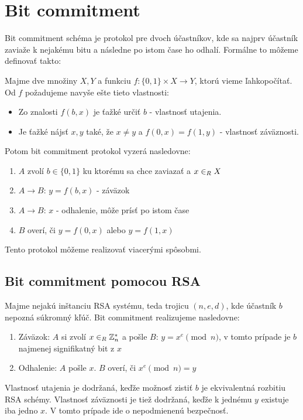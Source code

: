 \section{Bit commitment}

Bit commitment schéma je protokol pre dvoch účastníkov, kde sa najprv účastník
zaviaže k nejakému bitu a následne po istom čase ho odhalí.
Formálne to môžeme definovať takto:

\begin{definicia}
Majme dve množiny $X,Y$ a funkciu $f\colon \{0,1\} \times X \to Y$, ktorú vieme
\clqq ľahko\crqq počítať. Od $f$ požadujeme navyše ešte tieto vlastnosti:
\begin{itemize}
\item Zo znalosti $f(b,x)$ je ťažké určiť $b$ - vlastnosť utajenia.
\item Je ťažké nájsť $x, y$ také, že $x \neq y$ a $f(0,x) = f(1,y)$ - vlastnosť záväznosti.
\end{itemize}
Potom bit commitment protokol vyzerá nasledovne:
\begin{enumerate}
\item $A$ zvolí $b \in \{0,1\}$ ku ktorému sa chce zaviazať a $x \in_{R} X$
\item $A \to B$: $y = f(b,x)$ - záväzok
\item $A \to B$: $x$ - odhalenie, môže prísť po istom čase
\item $B$ overí, či $y = f(0,x)$ alebo $y = f(1,x)$
\end{enumerate}
\end{definicia}

Tento protokol môžeme realizovať viacerými spôsobmi. 

\subsection{Bit commitment pomocou RSA}

Majme nejakú inštanciu RSA systému, teda trojicu $(n,e,d)$, kde účastník $b$ nepozná súkromný kľúč.
Bit commitment realizujeme nasledovne:
\begin{enumerate}
\item Záväzok: $A$ si zvolí $x \in_{R} \mathbb{Z}_n^*$ a pošle $B$: $y = x^e \pmod n$, v tomto prípade je $b$ najmenej signifikatný bit z $x$
\item Odhalenie: $A$ pošle $x$. $B$ overí, či $x^e \pmod n = y$
\end{enumerate}

Vlastnosť utajenia je dodržaná, keďže možnosť zistiť $b$ je ekvivalentná rozbitiu RSA schémy.
Vlastnosť záväznosti je tiež dodržaná, keďže k jednému $y$ existuje iba jedno $x$. V tomto prípade ide o nepodmienenú bezpečnosť.

